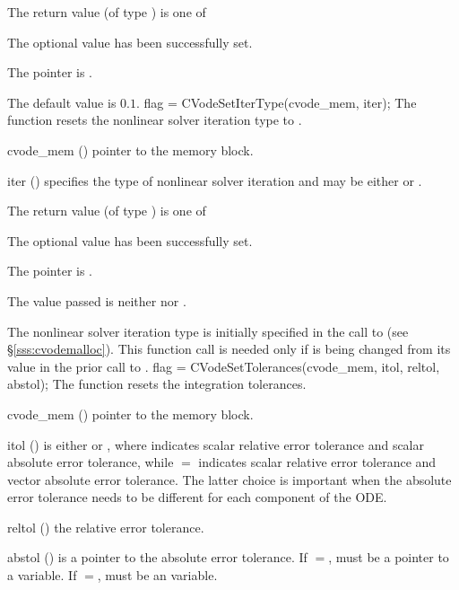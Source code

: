 {
  The return value  (of type ) is one of
  \begin{args}
  \item[\Id{CV\_SUCCESS}] 
    The optional value has been successfully set.
  \item[\Id{CV\_MEM\_NULL}]
    The  pointer is .
  \end{args}
}
{
  The default value is $0.1$.
}
{
flag = CVodeSetIterType(cvode\_mem, iter);
}
{
  The function  resets the nonlinear solver
  iteration type to .
}
{
  \begin{args}
  \item[cvode\_mem] ()
    pointer to the {\cvodes} memory block.
  \item[iter] ()
    specifies the type of nonlinear solver iteration and may be
    either  or . 
  \end{args}
}
{
  The return value  (of type ) is one of
  \begin{args}
  \item[\Id{CV\_SUCCESS}] 
    The optional value has been successfully set.
  \item[\Id{CV\_MEM\_NULL}]
    The  pointer is .
  \item[\Id{CV\_ILL\_INPUT}]
    The  value passed is neither  nor .
  \end{args}
}
{
  The nonlinear solver iteration type is initially specified in the call
  to  (see \S\ref{sss:cvodemalloc}). This function call is
  needed only if  is being changed from its value in the prior call 
  to .
}
{
flag = CVodeSetTolerances(cvode\_mem, itol, reltol, abstol);
}
{
  The function  resets the integration tolerances.
}
{
  \begin{args}
  \item[cvode\_mem] ()
    pointer to the {\cvodes} memory block.
  \item[itol] () 
    is either  or , where  indicates scalar
    relative error tolerance and scalar absolute error tolerance, while
    $=$ indicates scalar relative error tolerance and vector
    absolute error tolerance.  The latter choice is important when the absolute
    error tolerance needs to be different for each component of the ODE. 
  \item[reltol] ()
    the relative error tolerance.
  \item[abstol] ()
    is a pointer to the absolute error tolerance.  If $=$, 
    must be a pointer to a  variable. If $=$, 
    must be an  variable.
  \end{args}
}
